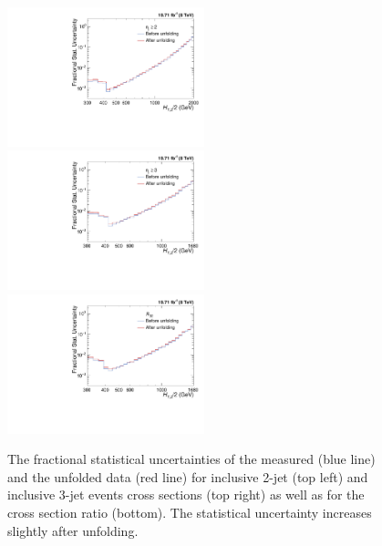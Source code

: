 \begin{figure}[!ht]
 \begin{center}
 \hspace*{-3mm}\includegraphics[width=0.51\textwidth]{Plots_HT_2_150/Comparison_stat_unc_2_HT_2_150.pdf}%
 ~~\includegraphics[width=0.51\textwidth]{Plots_HT_2_150/Comparison_stat_unc_3_HT_2_150.pdf}\\
 \includegraphics[width=0.51\textwidth]{Plots_HT_2_150/Comparison_stat_unc_ratio_32_symm.pdf}
 \caption{The fractional statistical uncertainties of the measured (blue line) and the unfolded data (red line) for inclusive 2-jet (top left) and inclusive 3-jet events cross sections (top right) as well as for the cross section ratio \ratio (bottom). The statistical uncertainty increases slightly after unfolding.}
 \label{fig:stat_unc}
 \end{center}
\end{figure}

